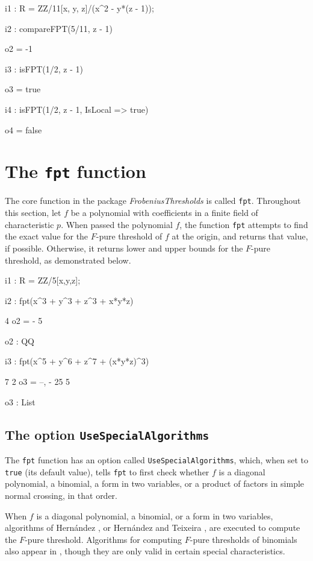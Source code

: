 \documentclass{amsart}
\begin{document}
\bigskip
{\small
{}
\begin{MyVerbatim}
i1 : R = ZZ/11[x, y, z]/(x^2 - y*(z - 1));

i2 : compareFPT(5/11, z - 1)

o2 = -1

i3 : isFPT(1/2, z - 1)

o3 = true

i4 : isFPT(1/2, z - 1, IsLocal => true)

o4 = false
\end{MyVerbatim}
}
\bigskip

\section{The {\tt fpt} function}
\label{sec.FPT}

The core function in the package \emph{FrobeniusThresholds} is called \texttt{fpt}.  Throughout this section, let $f$ be a polynomial with coefficients in a finite field of characteristic $p$. When passed the polynomial $f$, the function \texttt{fpt} attempts to find the exact value for the $F$-pure threshold of $f$ at the origin, and returns that value, if possible.  Otherwise, it returns lower and upper bounds for the $F$-pure threshold, as demonstrated below.

\bigskip
{\small
{}
\begin{MyVerbatim}
i1 : R = ZZ/5[x,y,z];

i2 : fpt(x^3 + y^3 + z^3 + x*y*z)

     4
o2 = -
     5

o2 : QQ

i3 : fpt(x^5 + y^6 + z^7 + (x*y*z)^3)

       7  2
o3 = {--, -}
      25  5

o3 : List
\end{MyVerbatim}
}
\bigskip

\subsection{The option \texttt{UseSpecialAlgorithms}}

The \texttt{fpt} function has an option called \texttt{UseSpecialAlgorithms}, which, when set to \texttt{true} (its default value), tells \texttt{fpt} to first check whether $f$ is a diagonal polynomial, a binomial, a form in two variables, or a product of factors in simple normal crossing, in that order.


When $f$ is a diagonal polynomial, a binomial, or a form in two variables, algorithms of Hern\'andez \cite{HernandezFInvariantsOfDiagonalHyp, HernandezFPureThresholdOfBinomial}, or Hern\'andez and Teixeira \cite{HernandezTeixeiraFThresholdFunctions},  are executed to compute the $F$-pure threshold.
Algorithms for computing $F$-pure thresholds of binomials also appear in \cite{ShibutaTakagiLCThresholds}, though they are only valid in certain special characteristics.
\end{document}
